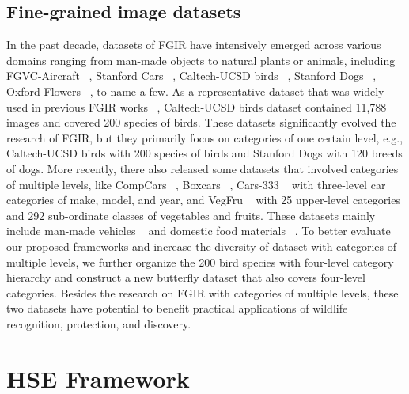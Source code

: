 \documentclass[sigconf]{acmart}
\begin{document}
\subsection{Fine-grained image datasets}
In the past decade, datasets of FGIR have intensively emerged across various domains ranging from man-made objects to natural plants or animals, including FGVC-Aircraft ~\cite{maji2013fine}, Stanford Cars ~\cite{krause20133d}, Caltech-UCSD birds ~\cite{wah2011caltech}, Stanford Dogs ~\cite{khosla2011novel}, Oxford Flowers ~\cite{nilsback2008automated}, to name a few. As a representative dataset that was widely used in previous FGIR works ~\cite{liu2017localizing,gao2016compact,he2017fine}, Caltech-UCSD birds dataset contained 11,788 images and covered 200 species of birds. These datasets significantly evolved the research of FGIR, but they primarily focus on categories of one certain level, e.g., Caltech-UCSD birds with 200 species of birds and Stanford Dogs with 120 breeds of dogs. More recently, there also released some datasets that involved categories of multiple levels, like CompCars ~\cite{yang2015large}, Boxcars ~\cite{sochor2016boxcars}, Cars-333 ~\cite{xie2014hyper} with three-level car categories of make, model, and year, and VegFru ~\cite{hou2017vegfru} with 25 upper-level categories and 292 sub-ordinate classes of vegetables and fruits. These datasets mainly include man-made vehicles ~\cite{yang2015large,sochor2016boxcars,xie2014hyper} and domestic food materials ~\cite{hou2017vegfru}. To better evaluate our proposed frameworks and increase the diversity of dataset with categories of multiple levels, we further organize the 200 bird species with four-level category hierarchy and construct a new butterfly dataset that also covers four-level categories. Besides the research on FGIR with categories of multiple levels, these two datasets have potential to benefit practical applications of wildlife recognition, protection, and discovery.


\section{HSE Framework}
\end{document}
